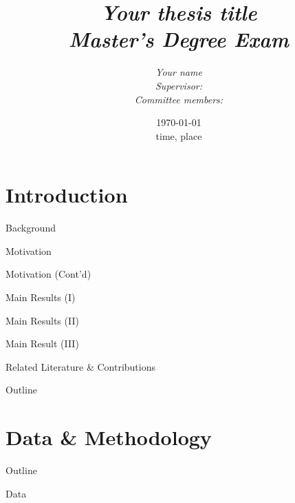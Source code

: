 \documentclass[10pt, mathserif, hyperref={hidelinks,colorlinks=true,linkcolor=blue,citecolor=blue},xcolor={dvipsnames}]{beamer}
\title[{\color{white} Short title}]{\textit{Your thesis title \\ \large{Master's Degree Exam}}}
\author[Your name]{{\itshape Your name}  \\ \textit{Supervisor: } \\
\vspace{0.5cm}
\textit{Committee members: }}
\date[\today]
	{\small{\today \\ time, place}}
\begin{document}
\begin{frame}[fragile]
    \titlepage
\end{frame}

\section{Introduction}

\begin{frame}{Background}
    \cite{lecun2015deep}
\end{frame}

\begin{frame}{Motivation}

\end{frame}

\begin{frame}{Motivation (Cont'd)}

\end{frame}

\begin{frame}{Main Results (I)}

\end{frame}

\begin{frame}{Main Results (II)}

\end{frame}

\begin{frame}{Main Result (III)}
    
\end{frame}

\begin{frame}{Related Literature \& Contributions}

\end{frame}


\begin{frame}{Outline}
    \tableofcontents
\end{frame}

\section{Data \& Methodology}

{   
    \begin{frame}{Outline}
    \tableofcontents[currentsection]
    \end{frame}
}

\begin{frame}{Data}

\end{frame}
\end{document}
